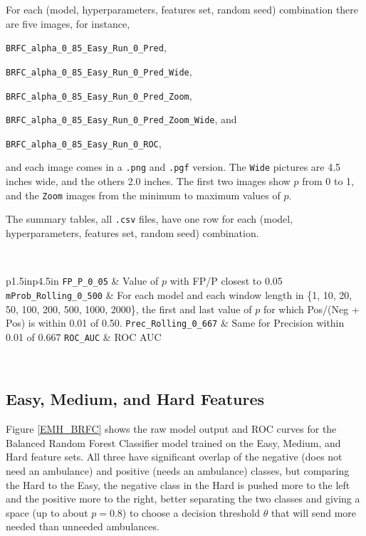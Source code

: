 For each (model, hyperparameters, features set, random seed) combination there are five images, for instance, 

\qquad \verb|BRFC_alpha_0_85_Easy_Run_0_Pred|,

\qquad \verb|BRFC_alpha_0_85_Easy_Run_0_Pred_Wide|, 

\qquad \verb|BRFC_alpha_0_85_Easy_Run_0_Pred_Zoom|,

\qquad \verb|BRFC_alpha_0_85_Easy_Run_0_Pred_Zoom_Wide|, and

\qquad \verb|BRFC_alpha_0_85_Easy_Run_0_ROC|, 

\noindent and each image comes in a \verb|.png| and \verb|.pgf| version.  The \verb|Wide| pictures are 4.5 inches wide, and the others 2.0 inches.  The first two images show $p$ from 0 to 1, and the \verb|Zoom| images from the minimum to maximum values of $p$.  

The summary tables, all \verb|.csv| files, have one row for each (model, hyperparameters, features set, random seed) combination.  

\

\begin{tabular}{p{1.5in}p{4.5in}}
	\verb|FP_P_0_05| & Value of $p$ with FP/P closest to 0.05 \cr
	\verb|mProb_Rolling_0_500| & For each model and each window length in \{1, 10, 20, 50, 100, 200, 500, 1000, 2000\}, the first and last value of $p$ for which Pos/(Neg + Pos) is within 0.01 of 0.50. \cr
	\verb|Prec_Rolling_0_667| & Same for Precision within 0.01 of 0.667 \cr
	\verb|ROC_AUC| & ROC AUC \cr
\end{tabular}

\



\subsection{Easy, Medium, and Hard Features}
\label{results_EMH}

Figure \ref{EMH_BRFC} shows the raw model output and ROC curves for the Balanced Random Forest Classifier model trained on the Easy, Medium, and Hard feature sets.  All three have significant overlap of the negative (does not need an ambulance) and positive (needs an ambulance) classes, but comparing the Hard to the Easy, the negative class in the Hard is pushed more to the left and the positive more to the right, better separating the two classes and giving a space (up to about $p=0.8$) to choose a decision threshold $\theta$ that will send more needed than unneeded ambulances.  


